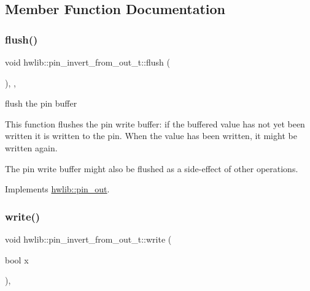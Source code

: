\subsection{Member Function Documentation}
\mbox{\label{classhwlib_1_1pin__invert__from__out__t_acb6c624010c503c5703c7fb7ec771619}} 
\subsubsection{\texorpdfstring{flush()}{flush()}}
{\footnotesize\ttfamily void hwlib\+::pin\+\_\+invert\+\_\+from\+\_\+out\+\_\+t\+::flush (\begin{DoxyParamCaption}{ }\end{DoxyParamCaption})\hspace{0.3cm}{\ttfamily [inline]}, {\ttfamily [override]}, {\ttfamily [virtual]}}





flush the pin buffer

This function flushes the pin write buffer\+: if the buffered value has not yet been written it is written to the pin. When the value has been written, it might be written again.

The pin write buffer might also be flushed as a side-\/effect of other operations. 

Implements \hyperlink{classhwlib_1_1pin__out_ac22910317477a52431a44e7e3c66fc57}{hwlib\+::pin\+\_\+out}.

\mbox{\label{classhwlib_1_1pin__invert__from__out__t_a0b069e2298848bd45ff1cc302d811e53}} 
\subsubsection{\texorpdfstring{write()}{write()}}
{\footnotesize\ttfamily void hwlib\+::pin\+\_\+invert\+\_\+from\+\_\+out\+\_\+t\+::write (\begin{DoxyParamCaption}\item[{bool}]{x }\end{DoxyParamCaption})\hspace{0.3cm}{\ttfamily [inline]}, {\ttfamily [virtual]}}





